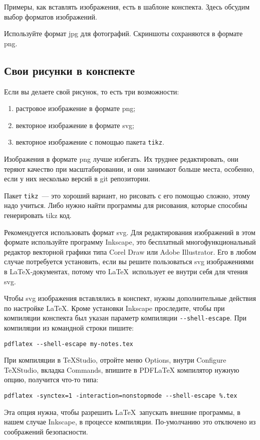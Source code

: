 \documentclass{article}
\begin{document}
    Примеры, как вставлять изображения, есть в шаблоне конспекта. Здесь обсудим выбор форматов изображений.

    Используйте формат jpg для фотографий. Скриншоты сохраняются в формате png.

    \subsection{Свои рисунки в конспекте}
    Если вы делаете свой рисунок, то есть три возможности:
    \begin{enumerate}
        \item растровое изображение в формате png;
        \item векторное изображение в формате svg;
        \item векторное изображение с помощью пакета \texttt{tikz}.
    \end{enumerate}

    Изображения в формате png лучше избегать. Их труднее редактировать, они теряют качество при масштабировании,
    и они занимают больше места, особенно, если у них несколько версий в git репозитории.

    Пакет \texttt{tikz}~--- это хороший вариант, но рисовать с его помощью сложно, этому надо учиться. Либо нужно
    найти программы для рисования, которые способны генерировать tikz код.

    Рекомендуется использовать формат svg. Для редактирования изображений в этом формате используйте программу
    Inkscape, это бесплатный многофункциональный редактор векторной графики типа Corel Draw или Adobe Illustrator.
    Его в любом случае потребуется установить, если вы решите пользоваться svg изображениями в \LaTeX-документах,
    потому что \LaTeX\ использует ее внутри себя для чтения svg.

    Чтобы svg изображения вставлялись в конспект, нужны дополнительные действия по настройке \LaTeX.
    Кроме установки Inkscape проследите, чтобы при компиляции конспекта был указан параметр компиляции
    \texttt{{-}-shell-escape}. При компиляции из командной строки пишите:
    \begin{verbatim}pdflatex --shell-escape my-notes.tex
    \end{verbatim}
    При компиляции в TeXStudio, отройте меню Options, внутри Configure TeXStudio, вкладка Commands, впишите
    в PDFLaTeX компилятор нужную опцию, получится что-то типа:
    \begin{verbatim}pdflatex -synctex=1 -interaction=nonstopmode --shell-escape %.tex
    \end{verbatim}
    Эта опция нужна, чтобы разрешить \LaTeX\ запускать внешние программы, в нашем случае Inkscape, в процессе
    компиляции. По-умолчанию это отключено из соображений безопасности.
\end{document}
